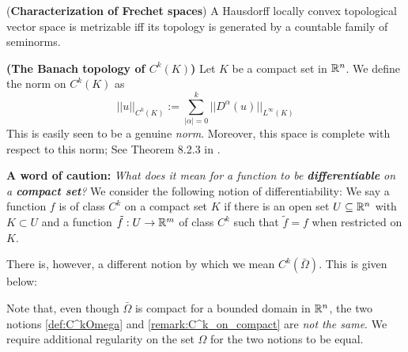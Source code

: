 \begin{theorem} (\textbf{Characterization of Frechet spaces})
A Hausdorff locally convex topological vector space is metrizable iff its topology is generated by a countable family of seminorms.
    
\end{theorem}


\begin{example}\label{example:C^kK}
    \textbf{(The Banach topology of $C^k(K)$)} Let $K$ be a compact set in $\mathbb{R}^n$. We  define the norm on $C^k(K)$ as \begin{equation}
        ||u||_{C^k(K)}:=\sum_{|\alpha|=0}^k ||D^{\alpha}(u)||_{L^\infty(K)}
    \end{equation}
This is easily seen to be a genuine \emph{norm}. Moreover, this space is complete with respect to this norm; See Theorem 8.2.3 in \cite{BartleSherbert2011}.

\end{example}
\begin{remark}\label{remark:C^k_on_compact}
    \textbf{A word of caution:} \emph{What does it mean for a function to be \textbf{differentiable} on a \textbf{compact set}?} We consider the following notion of differentiability: We say a function $f$ is of class $C^k$ on a compact set $K$ if there is an open set $U\subseteq \mathbb{R}^n$ with $K\subset U$ and a function $\tilde f:U\to \mathbb{R}^m$ of class $C^k$ such that $\tilde f=f$ when restricted on $K$.
\end{remark}
\begin{remark}
    There is, however, a different notion by which we mean $C^k(\bar{\Omega})$. This is given below:
\end{remark}
\begin{remark}
    Note that, even though $\bar\Omega$ is compact for a bounded domain in $\mathbb{R}^n$, the two notions \ref{def:C^kOmega} and \ref{remark:C^k_on_compact} are \emph{not the same}. We require additional regularity on the set $\Omega$ for the two notions to be equal. 
\end{remark}


